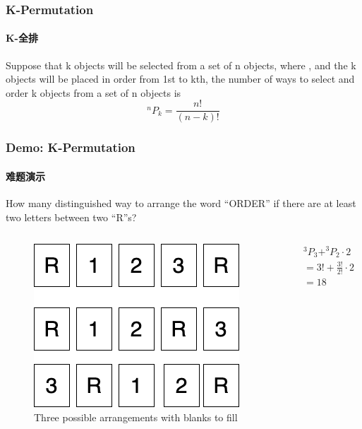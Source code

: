 \documentclass[
	11pt, %
]{beamer}
\begin{document}

\begin{frame}
	\frametitle{K-Permutation} %
	\framesubtitle{K-全排}
	\begin{definition}
		Suppose that k objects will be selected from a set of n
objects, where , and the k objects will be placed in order from 1st to
kth, the number of ways to select and order k objects from a set of n objects is \\
\begin{equation*}
	^nP_k =\frac{n!}{(n-k)!}
\end{equation*}
	\end{definition}
\end{frame}



\begin{frame}
	\frametitle{Demo: K-Permutation} %
	\framesubtitle{难题演示}
	How many distinguished way to arrange the word “ORDER” if there are at least
	two letters between two “R”s?

		\begin{columns}[t] 
			\begin{column}{0.5\textwidth} %
				\begin{figure}
					\includegraphics[width=0.8\linewidth]{ORDER.png}
					\caption{Three possible arrangements with blanks to fill}
				\end{figure}
			\end{column}
			\begin{column}{0.5\textwidth} %
				\begin{equation*}
					\begin{aligned}
						&^3P_3+ ^3P_2 \cdot 2 \\
						&=3! + \frac{3!}{2!} \cdot 2 \\
						&=18
					\end{aligned}
				\end{equation*}
			\end{column}
		\end{columns}
\end{frame}
\end{document}
